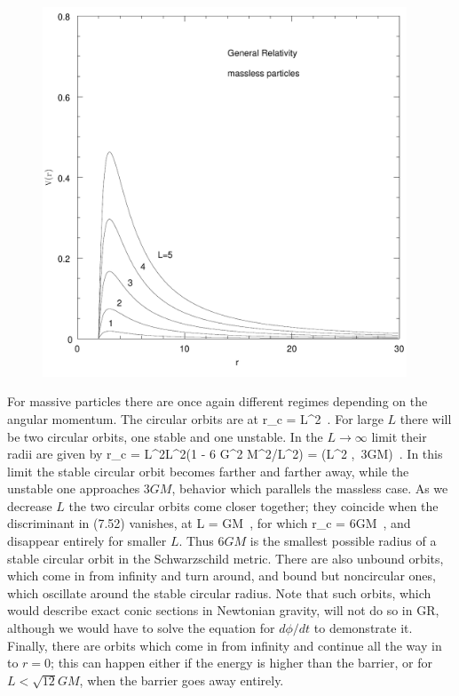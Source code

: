 \documentclass[12pt]{article}
\begin{document}
\begin{figure}
  \centerline{
  \includegraphics[height=11cm]{pdf/seven7}}
  \vskip-2cm
\end{figure}

For massive particles there are once again different regimes depending
on the angular momentum.  The circular orbits are at
\be
  r_c = {{L^2\pm {}}}\ .\label{7.52}
\ee
For large $L$ there will be two circular orbits, one stable and one 
unstable.  In the $L\rightarrow\infty$ limit their radii are given by
\be
  r_c = {{L^2\pm L^2(1 - 6 G^2 M^2/L^2)}} =
  \left({{L^2}} ,\ 3GM\right)\ .\label{7.53}
\ee
In this limit the stable circular orbit becomes farther and farther 
away, while the unstable one approaches $3GM$, behavior which parallels 
the massless case.  As we decrease $L$ the two circular
orbits come closer together; they coincide when the discriminant in
(7.52) vanishes, at
\be
  L = GM\ ,\label{7.54}
\ee
for which
\be
  r_c = 6GM\ ,\label{7.55}
\ee
and disappear entirely for smaller $L$.  Thus $6GM$ is the smallest 
possible radius of a stable circular orbit in the 
Schwarzschild metric.  There are also unbound orbits, which come in 
from infinity and turn around, and bound but noncircular ones, which
oscillate around the stable circular radius.  Note that such
orbits, which would describe exact conic sections in
Newtonian gravity, will not do so in GR, although we would have to
solve the equation for $d\phi/dt$ to demonstrate it.  Finally, there are
orbits which come in from infinity and continue all the way in to 
$r=0$; this can happen either if the energy is higher than the barrier,
or for $L<\sqrt{12}GM$, when the barrier goes away entirely.
\end{document}
